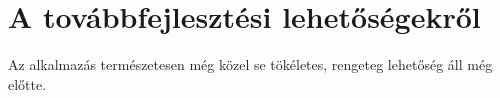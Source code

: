 \chapter{A továbbfejlesztési lehetőségekről}
\label{appx:further_development}

Az alkalmazás természetesen még közel se tökéletes, rengeteg lehetőség áll még előtte.
